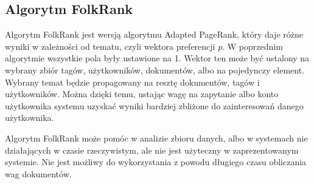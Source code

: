 \subsection{Algorytm FolkRank}
Algorytm FolkRank jest wersją algorytmu Adapted PageRank, który daje różne wyniki w zależności od tematu, czyli wektora preferencji $p$. W poprzednim algorytmie wszystkie pola były ustawione na 1. Wektor ten może być ustalony na wybrany zbiór tagów, użytkowników, dokumentów, albo na pojedynczy element. Wybrany temat będzie propagowany na resztę dokumentów, tagów i użytkowników. Można dzięki temu, ustając wagę na zapytanie albo konto użytkownika systemu uzyskać wyniki bardziej zbliżone do zainteresowań danego użytkownika.

Algorytm FolkRank może pomóc w analizie zbioru danych, albo w systemach nie działających w czasie rzeczywistym, ale nie jest użyteczny w zaprezentowanym systemie. Nie jest możliwy do wykorzystania z powodu długiego czasu obliczania wag dokumentów.




